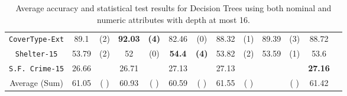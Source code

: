 \begin{table}
\begin{tabular}{c|cc|cc|cc|cc|cc|cc}
{\tt CoverType-Ext}  &  89.1          &  (2)              &  {\bf 92.03}&  {\bf (4)}    &  82.46       &  (0)               &  88.32      & (1)            & 89.39        & (3)       & 88.72        &           \\
{\tt Shelter-15}     &  53.79         &  (2)              &  52         &  (0)          &  {\bf 54.4}  &  {\bf (4)}         &  53.82      & (2)            & 53.59        & (1)       & 53.6         &           \\   
{\tt S.F. Crime-15}  &  26.66         &                   &  26.71      &               &  27.13       &                    &  27.13      &                &              &           & {\bf 27.16}  &           \\
\hline
Average (Sum)        &  61.05         &  ( )              & 60.93       &  ( )          &   60.59      &  (  )              &  61.55      & (  )           &              & ( )       & 61.42        &

\end{tabular}
\caption{Average accuracy and statistical test results for  Decision Trees using both nominal and numeric attributes with depth at most 16.}
\label{exp:numeric-16}
\normalsize
\end{table}

